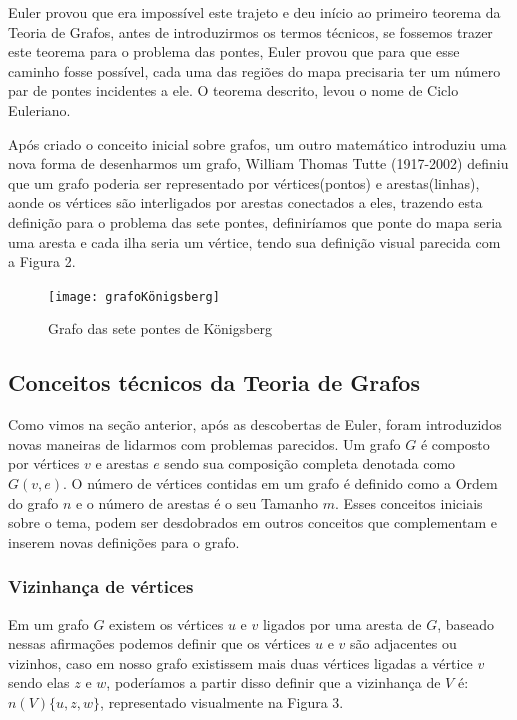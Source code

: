 \documentclass[12pt]{article}
\begin{document}
	Euler provou que era impossível este trajeto e deu início ao primeiro teorema da Teoria de Grafos, antes de introduzirmos os termos técnicos, se fossemos trazer este teorema para o problema das pontes, Euler provou que para que esse caminho fosse possível, cada uma das regiões do mapa precisaria ter um número par de pontes incidentes a ele. O teorema descrito, levou o nome de Ciclo Euleriano.
	
	Após criado o conceito inicial sobre grafos, um outro matemático introduziu uma nova forma de desenharmos um grafo, William Thomas Tutte (1917-2002) definiu que um grafo poderia ser representado por vértices(pontos) e arestas(linhas), aonde os vértices são interligados por arestas conectados a eles, trazendo esta definição para o problema das sete pontes, definiríamos que ponte do mapa seria uma aresta e cada ilha seria um vértice, tendo sua definição visual parecida com a Figura 2.
	
	
   \begin{figure}[!htb]
		\centering
		\texttt{[image: grafoKönigsberg]}
		\caption{ Grafo das sete pontes de Königsberg}    
	\end{figure}


	\subsection{Conceitos técnicos da Teoria de Grafos}
    Como vimos na seção anterior, após as descobertas de Euler, foram introduzidos novas maneiras de lidarmos com problemas parecidos.
	Um grafo $G$ é composto por vértices $v$ e arestas $e$ sendo sua composição completa denotada como $G (v, e)$. O número de vértices contidas em um grafo é definido como a Ordem do grafo $n$ e o número de arestas é o seu Tamanho $m$. Esses conceitos iniciais sobre o tema, podem ser desdobrados em outros conceitos que complementam e inserem novas definições para o grafo.
	
	\subsubsection{Vizinhança de vértices}
	
	Em um grafo $G$ existem os vértices $u$ e $v$ ligados por uma aresta de $G$, baseado nessas afirmações podemos definir que os vértices $u$ e $v$ são adjacentes ou vizinhos, caso em nosso grafo existissem mais duas vértices ligadas a vértice $v$ sendo elas $z$ e $w$, poderíamos a partir disso definir que a vizinhança de $V$ é: $n (V) \{u, z, w\}$, representado visualmente na Figura 3. 
		
\end{document}
